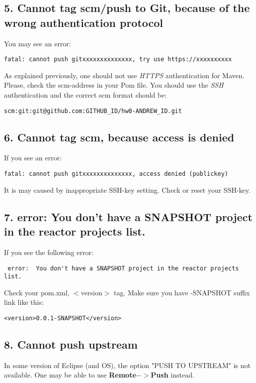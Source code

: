 \subsection{5. Cannot tag scm/push to Git, because of the wrong authentication protocol}

You may see an error:
\begin{verbatim}
fatal: cannot push gitxxxxxxxxxxxxxx, try use https://xxxxxxxxxx
\end{verbatim}

As explained previously, one should not use \emph{HTTPS} authentication 
for Maven. Please, check the scm-address in your Pom file.
You should use the \emph{SSH} authentication and the correct scm format 
should be:
\begin{verbatim}
scm:git:git@github.com:GITHUB_ID/hw0-ANDREW_ID.git
\end{verbatim}

\subsection{6. Cannot tag scm, because access is denied}

If you see an error:
\begin{verbatim}
fatal: cannot push gitxxxxxxxxxxxxxx, access denied (publickey)
\end{verbatim}
It is may caused by inappropriate SSH-key setting. Check or reset your SSH-key.

\subsection{7. 
 error:  You don't have a SNAPSHOT project in the reactor projects list.}
If you see the following error:
\begin{verbatim}
 error:  You don't have a SNAPSHOT project in the reactor projects list.
\end{verbatim}
Check your pom.xml, $<$version$>$ tag. Make sure you have -SNAPSHOT suffix link like this: 
\begin{verbatim}
<version>0.0.1-SNAPSHOT</version>
\end{verbatim}

\subsection{8. Cannot push upstream}

In some version of Eclipse (and OS), the option "PUSH TO UPSTREAM" is not available.
One may be able to use \textbf{Remote$->$Push} instead.

